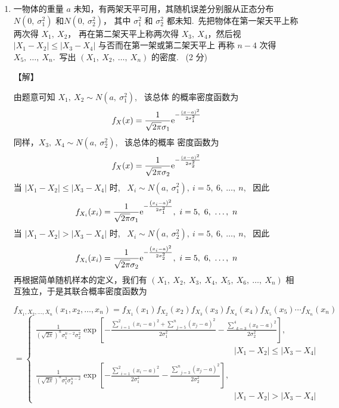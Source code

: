 \documentclass[openany]{book}
\begin{document}
\begin{enumerate}
  \item 一物体的重量 $a$ 未知，有两架天平可用，其随机误差分别服从正态分布
  $N\left( 0,~\sigma^2_1 \right)$ 和$ N\left( 0,~\sigma^2_2 \right)$，
  其中 $\sigma^2_1$ 和 $\sigma^2_2$ 都未知.~先把物体在第一架天平上称两次得
  $X_1,~X_2$，
  再在第二架天平上称两次得 $X_3,~X_4$，然后视 $\left| X_1 - X_2 \right|
  \leq \left| X_3 - X_4 \right|$ 与否而在第一架或第二架天平上
  再称 $n-4$ 次得 $X_5,~\ldots,~X_n$.~写出 $\left(
  X_1,~X_2,~\ldots,~X_n \right)$ 的密度.~{\color{cyan} (2 分)}

  {\color{red} \heiti 【解】} {\color{teal} \kaishu
    由题意可知 $X_1,~ X_2 \sim N \left( a,~ \sigma^2_1 \right)$,~ 该总体
    的概率密度函数为
    $$ f_X (x) = \frac{1}{\sqrt{2\pi} \sigma_1} {\rm
      e}^{-\frac{(x-a)^2}{2\sigma^2_1}} $$
    同样，$X_3,~ X_4 \sim N \left( a,~ \sigma^2_2 \right)$,~ 该总体的概率
    密度函数为
    $$ f_X (x) = \frac{1}{\sqrt{2\pi} \sigma_2} {\rm
      e}^{-\frac{(x-a)^2}{2\sigma^2_2}} $$
    当 $\left| X_1 - X_2 \right| \leq \left| X_3 - X_4 \right|$  时,~
    $X_i \sim N \left( a,~ \sigma^2_1 \right),~ i=5,~6,~\ldots,~n$,~
    因此
    $$ f_{X_i} (x_i) = \frac{1}{\sqrt{2\pi} \sigma_1} {\rm
      e}^{-\frac{\left( x_i-a \right)^2}{2\sigma^2_1}} ,~
    i=5,~6,~\ldots,~n $$
    当 $\left| X_1 - X_2 \right| > \left| X_3 - X_4 \right|$  时,~
    $X_i \sim N \left( a,~ \sigma^2_2 \right),~ i=5,~6,~\ldots,~n$,~
    因此
    $$ f_{X_i} (x_i) = \frac{1}{\sqrt{2\pi} \sigma_2} {\rm
      e}^{-\frac{\left( x_i-a \right)^2}{2\sigma^2_2}} ,~
    i=5,~6,~\ldots,~n $$
    再根据简单随机样本的定义，我们有 $\left( X_1,~ X_2,~ X_3,~ X_4,~ X_5,~
    X_6,~ \ldots,~ X_n \right)$ 相互独立，于是其联合概率密度函数为

    $$ f_{X_1, X_2, \ldots, X_n} \left( x_1, x_2, \ldots, x_n \right)
    = f_{X_1} \left( x_1 \right) f_{X_2} \left( x_2 \right)
    f_{X_3} \left( x_3 \right) f_{X_4} \left( x_4 \right) f_{X_5}
    \left( x_5 \right) \cdots f_{X_n} \left( x_n \right) $$
    $$ = \left\{ \begin{array}{l}
      \displaystyle{\frac{1}{\left( \sqrt{2\pi} \right)^n
          \sigma_1^{n-2}\sigma_2^2}} \exp
      \left[ -\frac{\underset{i=1}{\overset{2}{\sum}} \left( x_i - a
        \right)^2 + \underset{j=5}{\overset{n}{\sum}}
        \left( x_j - a \right)^2}{2\sigma_1^2} -
      \frac{\underset{k=3}{\overset{4}{\sum}} \left( x_k - a
        \right)^2}{2\sigma_2^2} \right], \\
      \hspace{10cm} \left| X_1 - X_2 \right| \leq \left| X_3 - X_4
      \right| \\ \\
      \displaystyle{\frac{1}{\left( \sqrt{2\pi} \right)^n
          \sigma_1^{2}\sigma_2^{n-2}}} \exp
      \left[ -\frac{\underset{i=1}{\overset{2}{\sum}} \left( x_i - a
        \right)^2}{2\sigma_1^2} -
      \frac{\underset{j=3}{\overset{n}{\sum}} \left( x_j - a
        \right)^2}{2\sigma_2^2} \right], \\
      \hspace{10cm} \left| X_1 - X_2 \right| > \left| X_3 - X_4
      \right|
    \end{array} \right. $$
  }


\end{enumerate}
\end{document}
